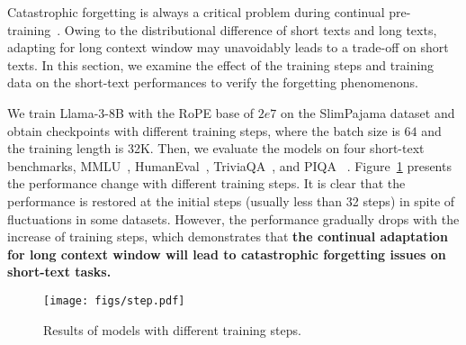 Catastrophic forgetting is always a critical problem during continual pre-training~\cite{wu-arxiv-2024-continual}. Owing to the distributional difference of short texts and long texts, adapting for long context window may unavoidably leads to a trade-off on short texts. 
In this section, we examine the effect of the training steps and training data on the short-text performances to verify the forgetting phenomenons. 

 We train Llama-3-8B with the RoPE base of $2e7$ on the SlimPajama dataset and obtain checkpoints with different training steps, where the batch size is $64$ and the training length is 32K. Then, we evaluate the models on four short-text benchmarks, \ie MMLU~\cite{Hendrycks-iclr-2021-mmlu}, HumanEval~\cite{chen-arxiv-2021-humaneval}, TriviaQA~\cite{Joshi-acl-2017-triviaqa}, and PIQA~
\cite{bisk-aaai-2020-piqa}. Figure~\ref{fig:step} presents the performance change with different training steps. It is clear that the performance is restored at the initial steps (usually less than 32 steps) in spite of fluctuations in some datasets. However, the performance gradually drops with the increase of training steps, which demonstrates that\textbf{ the continual adaptation for long context window will lead to catastrophic forgetting issues on short-text tasks.}


\begin{figure}[htb]
    \centering
    \texttt{[image: figs/step.pdf]}
    \caption{Results of models with different training steps.}
    \label{fig:step}
\end{figure}


